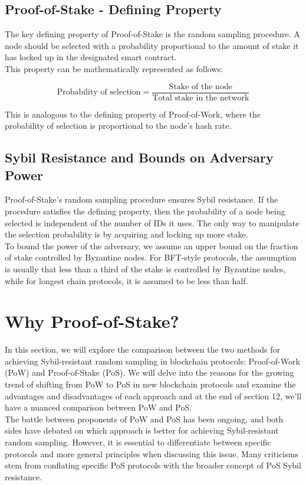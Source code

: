 \subsection{Proof-of-Stake - Defining Property}
The key defining property of Proof-of-Stake is the random sampling procedure. A node should be selected with a probability proportional to the amount of stake it has locked up in the designated smart contract.\\
This property can be mathematically represented as follows:

$$
\text{{Probability of selection}} = \frac{{\text{{Stake of the node}}}}{{\text{{Total stake in the network}}}}
$$

This is analogous to the defining property of Proof-of-Work, where the probability of selection is proportional to the node's hash rate.

\subsection{Sybil Resistance and Bounds on Adversary Power}
Proof-of-Stake's random sampling procedure ensures Sybil resistance. If the procedure satisfies the defining property, then the probability of a node being selected is independent of the number of IDs it uses. The only way to manipulate the selection probability is by acquiring and locking up more stake.\\
To bound the power of the adversary, we assume an upper bound on the fraction of stake controlled by Byzantine nodes. For BFT-style protocols, the assumption is usually that less than a third of the stake is controlled by Byzantine nodes, while for longest chain protocols, it is assumed to be less than half.

\section{Why Proof-of-Stake?}
In this section, we will explore the comparison between the two methods for achieving Sybil-resistant random sampling in blockchain protocols: Proof-of-Work (PoW) and Proof-of-Stake (PoS). We will delve into the reasons for the growing trend of shifting from PoW to PoS in new blockchain protocols and examine the advantages and disadvantages of each approach and at the end of section 12, we'll have a nuanced comparison between PoW and PoS.\\
The battle between proponents of PoW and PoS has been ongoing, and both sides have debated on which approach is better for achieving Sybil-resistant random sampling. However, it is essential to differentiate between specific protocols and more general principles when discussing this issue. Many criticisms stem from conflating specific PoS protocols with the broader concept of PoS Sybil resistance.


